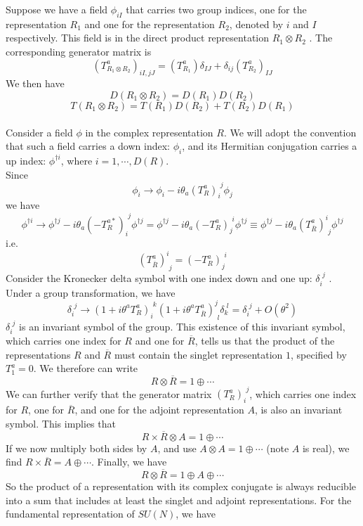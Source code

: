 \documentclass[cyan]{elegantnote}
\begin{document}
\noindent
Suppose we have a field $\phi_{iI}$ that carries two group indices, one for the representation $R_1$ and one for the representation $R_2$, denoted by $i$ and $I$ respectively.
This field is in the direct product representation $R_1 \otimes R_2$ . The corresponding generator matrix is
\[(T^a_{R_1 \otimes R_2})_{iI,jJ} = (T^a_{R_1})\delta_{IJ} + \delta_{ij}(T^a_{R_2})_{IJ}\]
We then have
\[D(R_1\otimes R_2) = D(R_1)D(R_2)\]
\[T(R_1\otimes R_2) = T(R_1)D(R_2) + T(R_2)D(R_1)\]
\\
Consider a field $\phi$ in the complex representation $R$. We will adopt the convention that such a field carries a
down index: $\phi_i$, and its Hermitian conjugation carries a up index: $\phi^{\dagger i}$, where $i = 1,\cdots,D(R)$.
\\ 
Since
\[\phi_i \to \phi_i - i\theta_a (T^a_R)_{i}^{\phantom{i}j}\phi_j \]
we have
\[\phi^{\dagger i} \to \phi^{\dagger j} - i\theta_a (-T^{a*}_R)_{i}^{\phantom{i}j}\phi^{\dagger j} = \phi^{\dagger j} - i\theta_a (-T^{a}_R)_{j}^{\phantom{i}i}\phi^{\dagger j} \equiv \phi^{\dagger j} - i\theta_a (T^{a}_{\overline{R}})^{i}_{\phantom{i}j}\phi^{\dagger j}\]
i.e.
\[(T^{a}_{\overline{R}})^{i}_{\phantom{i}j} = (-T^{a}_R)_{j}^{\phantom{i}i}\]
Consider the Kronecker delta symbol with one index down and one up: $\delta_i^{\phantom{i}j}$ . Under a group transformation, we have
\[\delta_i^{\phantom{i}j} \to (1+i\theta^a T^a_R)_{i}^{\phantom{i}k} (1+i\theta^a T^a_{\overline{R}})^{j}_{\phantom{i}l}\delta_k^{\phantom{i}l} = \delta_i^{\phantom{i}j} + O(\theta^2)\]
$\delta_i^{\phantom{i}j}$ is an invariant symbol of the group. This existence of this invariant symbol, which carries one index for $R$ and one for $\overline{R}$, tells us that the product of the representations $R$ and $\overline{R}$ must contain the singlet representation $1$, specified by $T_1^a = 0$. We therefore can write
\[R \otimes \overline{R} = 1 \oplus \cdots\]
We can further verify that the generator matrix $(T_R^a)_i^{\phantom{i}j}$, which carries one index for $R$, one for $\overline{R}$, and one for the adjoint representation $A$, is also an invariant symbol.
This implies that
\[R \times \overline{R} \otimes A = 1 \oplus \cdots\]
If we now multiply both sides by $A$, and use $A \otimes A = 1 \oplus \cdots$ (note $A$ is real), we find $R \times \overline{R} = A \oplus \cdots$. Finally, we have
\[R \otimes \overline{R} = 1 \oplus A \oplus \cdots \]
So the product of a representation with its complex conjugate is always reducible into a sum that includes at least the singlet and adjoint representations. For the fundamental representation of $SU(N)$, we have
\end{document}
